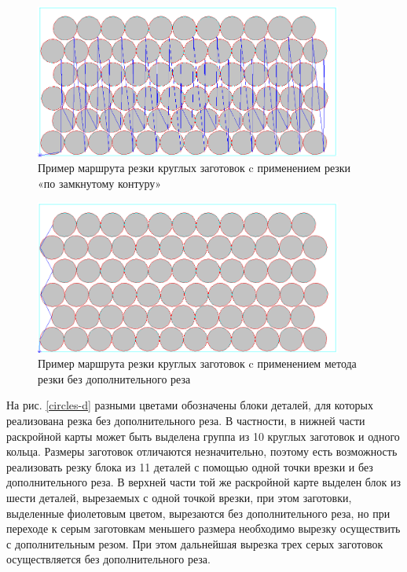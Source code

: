 \documentclass[12pt]{report}
\begin{document}
\begin{figure}
  \begin{center}
  \includegraphics[width=0.9\textwidth]{circles-a.png}
  \caption{Пример маршрута резки круглых заготовок c применением резки «по замкнутому контуру»}
  \label{circles-a}
  \end{center}
\end{figure}

\begin{figure}
  \begin{center}
  \includegraphics[width=0.9\textwidth]{circles-b.png}
  \caption{Пример маршрута резки круглых заготовок c применением метода резки без дополнительного реза}
  \label{circles-b}
  \end{center}
\end{figure}

На рис. \ref{circles-d}
разными цветами обозначены блоки деталей,
для которых реализована резка без дополнительного реза.
В частности, в нижней  части раскройной карты
может быть выделена
группа из 10 круглых заготовок и одного кольца.
Размеры заготовок отличаются незначительно,
поэтому есть возможность реализовать резку блока из 11 деталей с
помощью одной точки врезки и без дополнительного реза.
В  верхней части той же раскройной карте выделен блок из шести деталей,
вырезаемых с одной точкой врезки, при этом заготовки,
выделенные фиолетовым цветом, вырезаются без дополнительного реза,
но при переходе к серым заготовкам меньшего размера необходимо
вырезку осуществить с дополнительным резом.
При этом дальнейшая вырезка трех серых заготовок
осуществляется без дополнительного реза.
\end{document}
